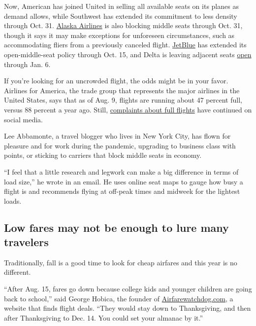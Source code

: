 Now, American has joined United in selling all available seats on its
planes as demand allows, while Southwest has extended its commitment to
less density through Oct. 31.
\href{https://www.alaskaair.com/content/advisories/coronavirus}{Alaska
Airlines} is also blocking middle seats through Oct. 31, though it says
it may make exceptions for unforeseen circumstances, such as
accommodating fliers from a previously canceled flight.
\href{https://www.jetblue.com/safety}{JetBlue} has extended its
open-middle-seat policy through Oct. 15, and Delta is leaving adjacent
seats
\href{https://news.delta.com/more-space-through-summer-delta-will-block-middle-seat-selection-cap-cabin-seating-through-sept-30}{open}
through Jan. 6.

If you're looking for an uncrowded flight, the odds might be in your
favor. Airlines for America, the trade group that represents the major
airlines in the United States, says that as of Aug. 9, flights are
running about 47 percent full, versus 88 percent a year ago. Still,
\href{https://www.nytimes3xbfgragh.onion/2020/07/21/travel/crowded-flights-coronavirus.html}{complaints
about full flights} have continued on social media.

Lee Abbamonte, a travel blogger who lives in New York City, has flown
for pleasure and for work during the pandemic, upgrading to business
class with points, or sticking to carriers that block middle seats in
economy.

``I feel that a little research and legwork can make a big difference in
terms of load size,'' he wrote in an email. He uses online seat maps to
gauge how busy a flight is and recommends flying at off-peak times and
midweek for the lightest loads.

\hypertarget{low-fares-may-not-be-enough-to-lure-many-travelers}{%
\subsection{Low fares may not be enough to lure many
travelers}\label{low-fares-may-not-be-enough-to-lure-many-travelers}}

Traditionally, fall is a good time to look for cheap airfares and this
year is no different.

``After Aug. 15, fares go down because college kids and younger children
are going back to school,'' said George Hobica, the founder of
\href{https://www.airfarewatchdog.com/}{Airfarewatchdog.com}, a website
that finds flight deals. ``They would stay down to Thanksgiving, and
then after Thanksgiving to Dec. 14. You could set your almanac by it.''

